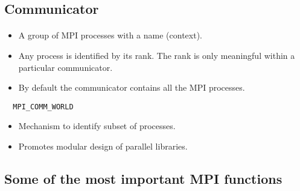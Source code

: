\documentclass[%
oneside,                 %
final,                   %
10pt]{article}
\begin{document}
\subsection*{Communicator}

\paragraph{}
\begin{itemize}
\item A group of MPI processes with a name (context).

\item Any process is identified by its rank. The rank is only meaningful within a particular communicator.

\item By default the communicator contains all the MPI processes.
\end{itemize}

\noindent


\begin{verbatim}
  MPI_COMM_WORLD 

\end{verbatim}

\begin{itemize}
\item Mechanism to identify subset of processes.

\item Promotes modular design of parallel libraries.
\end{itemize}

\noindent



\subsection*{Some of the most  important MPI functions}

\paragraph{}
\end{document}
